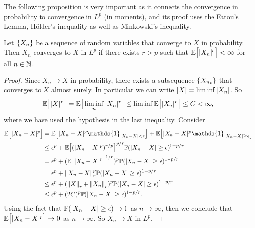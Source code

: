 The following proposition is very important as it connects the convergence in probability to convergence in $ L^p $ (in moments), and its proof uses the Fatou's Lemma, H\"{o}lder's inequality as well as Minkowski's inequality.

\begin{proposition}
	Let $ \{X_n\} $ be a sequence of random variables that converge to $ X $ in probability. Then $ X_n $ converges to $ X $ in $ L^p $ if there exists $ r>p $ such that $ \mathbb{E}\big[|X_n|^r\big] < \infty $ for all $ n\in \mathbb{N} $.
\end{proposition}
\begin{proof}
	Since $ X_n\to X $ in probability, there exists a subsequence $ \{X_{n_k}\} $ that converges to $ X $ almost surely. In particular we can write $ |X| = \liminf |X_n| $. So
	\[ \mathbb{E}\big[|X|^r\big] = \mathbb{E}\big[\liminf_n |X_n|^r\big] \leq \liminf \mathbb{E}\big[|X_n|^r\big] \leq C < \infty, \]
	where we have used the hypothesis in the last inequality. Consider
	\begin{align*}
		\E{\abs{X_n - X}^p} &= \E{\abs{X_n-X}^p \mathds{1}_{\abs{X_n - X} < \epsilon}} + \E{\abs{X_n - X}^p \mathds{1}_{\abs{X_n-X}\geq \epsilon} } \\
		&\leq \epsilon^p + \E{(\abs{X_n-X}^p)^{r/p}}^{p/r} \prob(\abs{X_n-X} \geq \epsilon)^{1-p/r} \\
		&= \epsilon^p + (\E{\abs{X_n - X}^r}^{1/r})^{p} \prob(\abs{X_n-X}\geq \epsilon)^{1-p/r} \\
		&= \epsilon^p + \norm{X_n-X}_r^p\prob(\abs{X_n-X}\geq\epsilon)^{1-p/r} \\
		&\leq \epsilon^p + (\norm{X}_r + \norm{X_n}_r)^p \prob(\abs{X_n-X}\geq\epsilon)^{1-p/r} \\
		&\leq \epsilon^p + (2C)^{p}\prob(\abs{X_n-X}\geq\epsilon)^{1-p/r}.
	\end{align*}
	Using the fact that $ \mathbb{P}(|X_n-X|\geq \epsilon) \to 0 $ as $ n\to\infty $, then we conclude that $ \mathbb{E}\big[|X_n-X|^p\big] \to 0 $ as $ n\to\infty $. So $ X_n \to X $ in $ L^p $.
\end{proof}